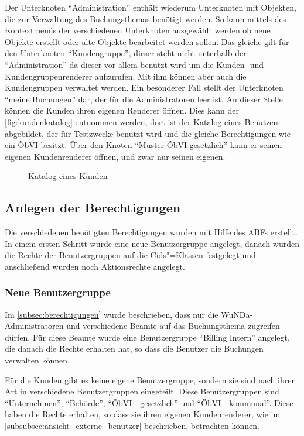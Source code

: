 Der Unterknoten "`Administration"' enthält wiederum Unterknoten mit Objekten, die zur Verwaltung des Buchungsthemas benötigt werden.
So kann mittels des Kontextmenüs der verschiedenen Unterknoten ausgewählt werden ob neue Objekte erstellt oder alte Objekte bearbeitet werden sollen.
Das gleiche gilt für den Unterknoten "`Kundengruppe"', dieser steht nicht unterhalb der "`Administration"' da dieser vor allem benutzt wird um die Kunden- und Kundengruppenrenderer aufzurufen. Mit ihm können aber auch die Kundengruppen verwaltet werden.
Ein besonderer Fall stellt der Unterknoten "`meine Buchungen"' dar, der für die Administratoren leer ist.
An dieser Stelle können die Kunden ihren eigenen Renderer öffnen.
Dies kann der \autoref{fig:kundenkatalog} entnommen werden, dort ist der Katalog eines Benutzers abgebildet, der für Testzwecke benutzt wird und die gleiche Berechtigungen wie ein \ac{ÖbVI} besitzt. Über den Knoten \enquote{Muster ÖbVI gesetzlich} kann er seinen eigenen Kundenrenderer öffnen, und zwar nur seinen eigenen.
\begin{figure}[htb]
  \centering
  \caption{Katalog eines Kunden} \label{fig:kundenkatalog} 
\end{figure}
 

\subsection{Anlegen der Berechtigungen}

Die verschiedenen benötigten Berechtigungen wurden mit Hilfe des \ac{ABF}s erstellt.
In einem ersten Schritt wurde eine neue Benutzergruppe angelegt, danach wurden die Rechte der Benutzergruppen auf die Cids"=Klassen festgelegt und anschließend wurden noch Aktionsrechte angelegt. 

\subsubsection{Neue Benutzergruppe}
Im \autoref{subsec:berechtigungen} wurde beschrieben, dass nur die \ac{WuNDa}-Administratoren und verschiedene Beamte auf das Buchungsthema zugreifen dürfen.
Für diese Beamte wurde eine Benutzergruppe "`Billing Intern"' angelegt, die danach die Rechte erhalten hat, so dass die Benutzer die Buchungen verwalten können.

Für die Kunden gibt es keine eigene Benutzergruppe, sondern sie sind nach ihrer Art in verschiedene Benutzergruppen eingeteilt.
Diese Benutzergruppen sind "`Unternehmen"', "`Behörde"', "`ÖbVI - gesetzlich"' und "`ÖbVI - kommunal"'.
Diese haben die Rechte erhalten, so dass sie ihren eigenen Kundenrenderer, wie im \autoref{subsubsec:ansicht_externe_benutzer} beschrieben, betrachten können.

